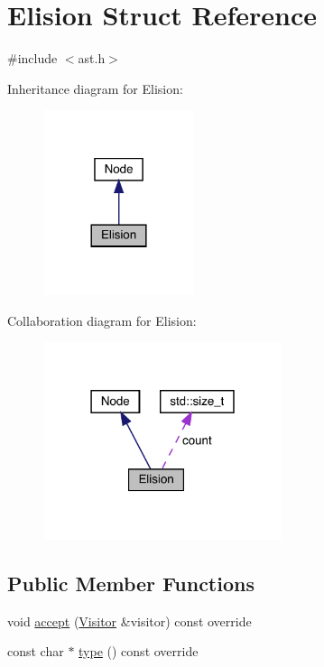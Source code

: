 \hypertarget{struct_elision}{}\section{Elision Struct Reference}
\label{struct_elision}


{\ttfamily \#include $<$ast.\+h$>$}



Inheritance diagram for Elision\+:
\nopagebreak
\begin{figure}[H]
\begin{center}
\leavevmode
\includegraphics[width=125pt]{struct_elision__inherit__graph}
\end{center}
\end{figure}


Collaboration diagram for Elision\+:
\nopagebreak
\begin{figure}[H]
\begin{center}
\leavevmode
\includegraphics[width=198pt]{struct_elision__coll__graph}
\end{center}
\end{figure}
\subsection*{Public Member Functions}
\begin{DoxyCompactItemize}
\item 
void \hyperlink{struct_elision_ac99f60fccfcedcf9cd090f5682b2e6dd}{accept} (\hyperlink{struct_visitor}{Visitor} \&visitor) const override
\item 
const char $\ast$ \hyperlink{struct_elision_adf289443c761e9ffaec9440510dd21c4}{type} () const override
\end{DoxyCompactItemize}
